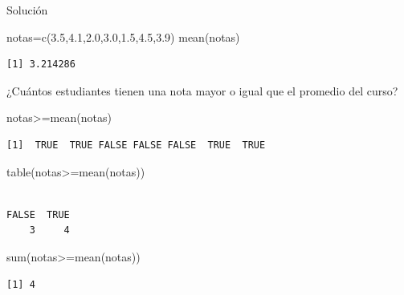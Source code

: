 \documentclass[
  ignorenonframetext,
  aspectratio=169,
  spanish,
]{beamer}
\newenvironment{Shaded}{\begin{snugshade}}{\end{snugshade}}
\newcommand{\FloatTok}[1]{\textcolor[rgb]{0.68,0.00,0.00}{#1}}
\newcommand{\FunctionTok}[1]{\textcolor[rgb]{0.28,0.35,0.67}{#1}}
\newcommand{\NormalTok}[1]{\textcolor[rgb]{0.00,0.23,0.31}{#1}}
\newcommand{\OtherTok}[1]{\textcolor[rgb]{0.00,0.23,0.31}{#1}}
\newcommand{\SpecialCharTok}[1]{\textcolor[rgb]{0.37,0.37,0.37}{#1}}
\begin{document}
\begin{frame}[fragile]{Solución}
\label{soluciuxf3n-1}
\begin{Shaded}
\begin{Highlighting}[]
\NormalTok{notas}\OtherTok{=}\FunctionTok{c}\NormalTok{(}\FloatTok{3.5}\NormalTok{,}\FloatTok{4.1}\NormalTok{,}\FloatTok{2.0}\NormalTok{,}\FloatTok{3.0}\NormalTok{,}\FloatTok{1.5}\NormalTok{,}\FloatTok{4.5}\NormalTok{,}\FloatTok{3.9}\NormalTok{)}
\FunctionTok{mean}\NormalTok{(notas)}
\end{Highlighting}
\end{Shaded}

\begin{verbatim}
[1] 3.214286
\end{verbatim}

¿Cuántos estudiantes tienen una nota mayor o igual que el promedio del
curso?

\begin{Shaded}
\begin{Highlighting}[]
\NormalTok{notas}\SpecialCharTok{\textgreater{}=}\FunctionTok{mean}\NormalTok{(notas)}
\end{Highlighting}
\end{Shaded}

\begin{verbatim}
[1]  TRUE  TRUE FALSE FALSE FALSE  TRUE  TRUE
\end{verbatim}

\begin{Shaded}
\begin{Highlighting}[]
\FunctionTok{table}\NormalTok{(notas}\SpecialCharTok{\textgreater{}=}\FunctionTok{mean}\NormalTok{(notas))}
\end{Highlighting}
\end{Shaded}

\begin{verbatim}

FALSE  TRUE 
    3     4 
\end{verbatim}

\begin{Shaded}
\begin{Highlighting}[]
\FunctionTok{sum}\NormalTok{(notas}\SpecialCharTok{\textgreater{}=}\FunctionTok{mean}\NormalTok{(notas))}
\end{Highlighting}
\end{Shaded}

\begin{verbatim}
[1] 4
\end{verbatim}
\end{frame}
\end{document}
